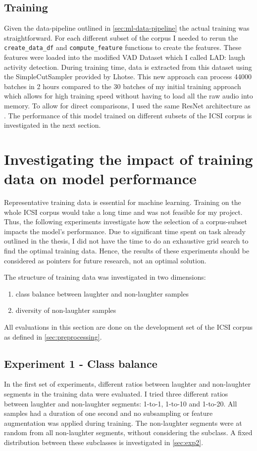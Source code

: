 \documentclass[bsc,frontabs,parskip,deptreport]{infthesis}
\begin{document}
\section{Training}
Given the data-pipeline outlined in \autoref{sec:ml-data-pipeline} the actual training was straightforward. For each different subset of the corpus I needed to rerun the \verb|create_data_df| and \verb|compute_feature| functions to create the features. 
These features were loaded into the modified VAD Dataset which I called LAD: laugh activity detection.
During training time, data is extracted from this dataset using the SimpleCutSampler provided by Lhotse. 
This new approach can process 44000 batches in 2 hours compared to the 30 batches of my initial training approach which allows for high training speed without having to load all the raw audio into memory.
To allow for direct comparisons, I used the same ResNet architecture as \citet{gillick2021robust}.
The performance of this model trained on different subsets of the ICSI corpus is investigated in the next section.

\chapter{Investigating the impact of training data on model performance} \label{cha:experiments}
Representative training data is essential for machine learning. Training on the whole ICSI corpus would take a long time and was not feasible for my project.
Thus, the following experiments investigate how the selection of a corpus-subset impacts the model's performance. 
Due to significant time spent on task already outlined in the thesis, I did not have the time to do an exhaustive grid search to find the optimal training data.
Hence, the results of these experiments should be considered as pointers for future research, not an optimal solution.

The structure of training data was investigated in two dimensions: 
\begin{enumerate}
    \item class balance between laughter and non-laughter samples
    \item diversity of non-laughter samples 
\end{enumerate}

All evaluations in this section are done on the development set of the ICSI corpus as defined in \autoref{sec:preprocessing}.

\section{Experiment 1 - Class balance} \label{sec:exp-1}
In the first set of experiments, different ratios between laughter and non-laughter segments in the training data were evaluated. 
I tried three different ratios between laughter and non-laughter segments: 1-to-1, 1-to-10 and 1-to-20.
All samples had a duration of one second and no subsampling or feature augmentation was applied during training.
The non-laughter segments were at random from all non-laughter segments, without considering the subclass. 
A fixed distribution between these subclasses is investigated in \autoref{sec:exp2}.
\end{document}
